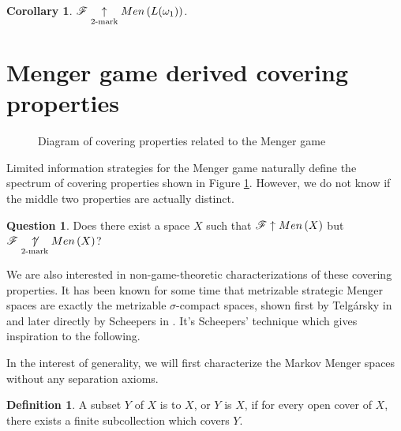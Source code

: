 \documentclass{amsart}
\newtheorem{corollary}[theorem]{Corollary}
\theoremstyle{definition}
\newtheorem{definition}[theorem]{Definition}
\newtheorem{question}[theorem]{Question}
\begin{document}
\begin{corollary}
  \(\mathscr{F} \underset{2\text{-mark}}{\uparrow}Men\left({L(\omega_1)}\right)\).
\end{corollary}



\section{Menger game derived covering properties}

\begin{figure}[h]
\caption{Diagram of covering properties related to the Menger game}
\label{menSpec}
\end{figure}

Limited information strategies for the Menger game naturally define the
spectrum of covering properties shown in Figure \ref{menSpec}. However,
we do not know if the middle two properties are actually distinct.

\begin{question}\label{perfectTo2Mark}
  Does there exist a space \(X\) such that \(\mathscr{F} \uparrow Men\left({X}\right)\) but
  \(\mathscr{F} \underset{2\text{-mark}}{\not\uparrow} Men\left({X}\right)\)?
\end{question}

We are also interested in non-game-theoretic characterizations of these
covering properties. It has been known for some time that metrizable strategic
Menger spaces are exactly the metrizable \(\sigma\)-compact spaces, shown first
by Telg\'arsky in \cite{MR753073} and later directly by Scheepers in
\cite{MR1273523}. It's Scheepers' technique which gives inspiration to
the following.

In the interest of generality, we will first characterize the Markov Menger
spaces without any separation axioms.

\begin{definition}
  A subset \(Y\) of \(X\) is  to \(X\), or
  \(Y\) is  \(X\), if for every open
  cover of \(X\), there exists a finite subcollection which covers \(Y\).
\end{definition}
\end{document}
